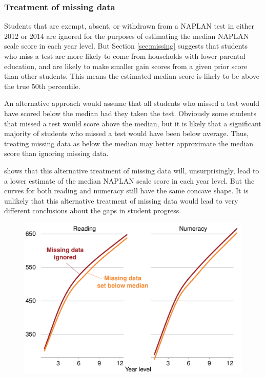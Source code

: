 \subsubsection{Treatment of missing data}

Students that are exempt, absent, or withdrawn from a NAPLAN test in either 2012 or 2014 are ignored for the purposes of estimating the median NAPLAN scale score in each year level. But Section \ref{sec:missing} suggests that students who miss a test are more likely to come from households with lower parental education, and are likely to make smaller gain scores from a given prior score than other students. This means the estimated median score is likely to be above the true 50th percentile.

An alternative approach would assume that all students who missed a test would have scored below the median had they taken the test. Obviously some students that missed a test would score above the median, but it is likely that a significant majority of students who missed a test would have been below average. Thus, treating missing data as below the median may better approximate the median score than ignoring missing data.

 shows that this alternative treatment of missing data will, unsurprisingly, lead to a lower estimate of the median NAPLAN scale score in each year level. But the curves for both reading and numeracy still have the same concave shape. It is unlikely that this alternative treatment of missing data would lead to very different conclusions about the gaps in student progress. 

\begin{figure}[H]

 \includegraphics[width=\columnwidth]{atlas/missing_median.pdf}\label{fig:missing_median}

\end{figure}
\vspace{-15pt}

